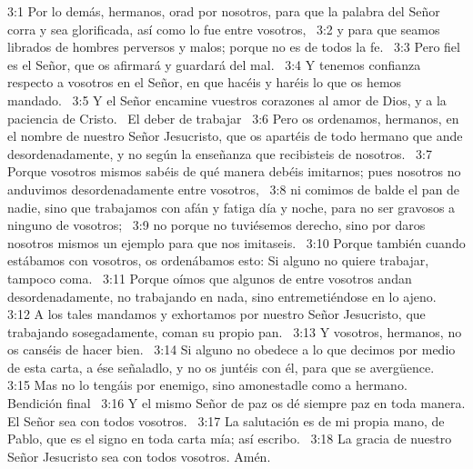 3:1 Por lo demás, hermanos, orad por nosotros, para que la palabra del Señor corra y sea glorificada, así como lo fue entre vosotros,  
3:2 y para que seamos librados de hombres perversos y malos; porque no es de todos la fe.  
3:3 Pero fiel es el Señor, que os afirmará y guardará del mal.  
3:4 Y tenemos confianza respecto a vosotros en el Señor, en que hacéis y haréis lo que os hemos mandado.  
3:5 Y el Señor encamine vuestros corazones al amor de Dios, y a la paciencia de Cristo.  
El deber de trabajar  
3:6 Pero os ordenamos, hermanos, en el nombre de nuestro Señor Jesucristo, que os apartéis de todo hermano que ande desordenadamente, y no según la enseñanza que recibisteis de nosotros.  
3:7 Porque vosotros mismos sabéis de qué manera debéis imitarnos; pues nosotros no anduvimos desordenadamente entre vosotros,  
3:8 ni comimos de balde el pan de nadie, sino que trabajamos con afán y fatiga día y noche, para no ser gravosos a ninguno de vosotros;  
3:9 no porque no tuviésemos derecho, sino por daros nosotros mismos un ejemplo para que nos imitaseis.  
3:10 Porque también cuando estábamos con vosotros, os ordenábamos esto: Si alguno no quiere trabajar, tampoco coma.  
3:11 Porque oímos que algunos de entre vosotros andan desordenadamente, no trabajando en nada, sino entremetiéndose en lo ajeno.  
3:12 A los tales mandamos y exhortamos por nuestro Señor Jesucristo, que trabajando sosegadamente, coman su propio pan.  
3:13 Y vosotros, hermanos, no os canséis de hacer bien.  
3:14 Si alguno no obedece a lo que decimos por medio de esta carta, a ése señaladlo, y no os juntéis con él, para que se avergüence.  
3:15 Mas no lo tengáis por enemigo, sino amonestadle como a hermano.  
Bendición final  
3:16 Y el mismo Señor de paz os dé siempre paz en toda manera. El Señor sea con todos vosotros.  
3:17 La salutación es de mi propia mano, de Pablo, que es el signo en toda carta mía; así escribo.  
3:18 La gracia de nuestro Señor Jesucristo sea con todos vosotros. Amén. 